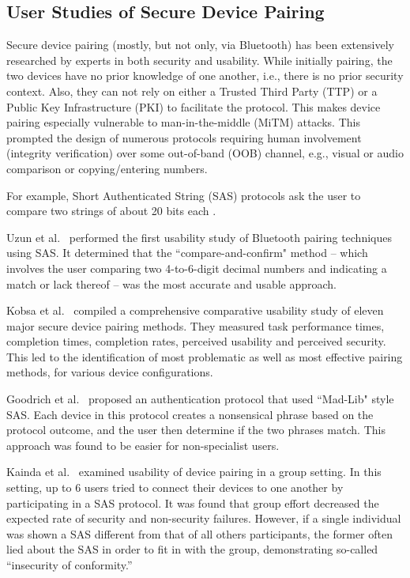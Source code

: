 \documentclass{llncs}
\begin{document}
%
\subsection{User Studies of Secure Device Pairing}
%
Secure device pairing (mostly, but not only, via Bluetooth) has been extensively researched by 
experts in both security and usability. While initially pairing, the two devices have
no prior knowledge of one another, i.e., there is no prior security context. Also, they can not
rely on either a Trusted Third Party (TTP) or a Public Key Infrastructure (PKI) to facilitate the protocol. 
This makes device pairing especially vulnerable to man-in-the-middle (MiTM) attacks. This prompted 
the design of numerous protocols requiring human involvement (integrity verification) over 
some out-of-band (OOB) channel, e.g., visual or audio comparison or copying/entering numbers.

For example, Short Authenticated String (SAS) protocols ask the user to compare two 
strings of about 20 bits each \cite{cryptoeprint:2005:424}. 

Uzun et al.~\cite{Uzun_2007} performed the first usability study of Bluetooth 
pairing techniques using SAS. It determined that the ``compare-and-confirm" method
-- which involves the user comparing two 4-to-6-digit decimal numbers and indicating 
a match or lack thereof -- was the most accurate and usable approach. 

Kobsa et al.~\cite{kobsa_serial_2009} compiled a comprehensive comparative 
usability study of eleven major secure device pairing methods. They measured task 
performance times, completion times, completion rates, perceived usability and 
perceived security. This led to the identification of most problematic as well as  
most effective pairing methods, for various device configurations.

Goodrich et al.~\cite{goodrich_using_2009} proposed an authentication protocol 
that used ``Mad-Lib" style SAS. Each device in this protocol creates a nonsensical 
phrase based on the protocol outcome, and the user then determine if the two phrases
match. This approach was found to be easier for non-specialist users.

Kainda et al.~\cite{kainda_usability_2009} examined usability of device pairing in a group 
setting. In this setting, up to 6 users tried to connect their devices to one another by participating 
in a SAS protocol. It was found that group effort decreased the expected rate of security and 
non-security failures. However, if a single individual was shown a SAS different from that of 
all others participants, the former often lied about the SAS in order to fit in with the group, 
demonstrating so-called ``insecurity of conformity.''
\end{document}
